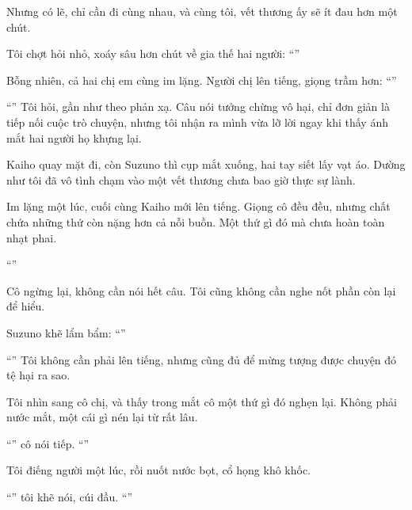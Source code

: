 \documentclass[../main.tex]{subfiles}
\begin{document}
Nhưng có lẽ, chỉ cần đi cùng nhau, và cùng tôi, vết thương ấy sẽ ít đau hơn một chút.

Tôi chợt hỏi nhỏ, xoáy sâu hơn chút về gia thế hai người: ``''

Bỗng nhiên, cả hai chị em cùng im lặng. Người chị lên tiếng, giọng trầm hơn: ``''

``'' Tôi hỏi, gần như theo phản xạ. Câu nói tưởng chừng vô hại, chỉ đơn giản là tiếp nối cuộc trò chuyện, nhưng tôi nhận ra mình vừa lỡ lời ngay khi thấy ánh mắt hai người họ khựng lại.

Kaiho quay mặt đi, còn Suzuno thì cụp mắt xuống, hai tay siết lấy vạt áo. Dường như tôi đã vô tình chạm vào một vết thương chưa bao giờ thực sự lành.

Im lặng một lúc, cuối cùng Kaiho mới lên tiếng. Giọng cô đều đều, nhưng chất chứa những thứ còn nặng hơn cả nỗi buồn. Một thứ gì đó mà chưa hoàn toàn nhạt phai.

``''

Cô ngừng lại, không cần nói hết câu. Tôi cũng không cần nghe nốt phần còn lại để hiểu.

Suzuno khẽ lẩm bẩm: ``''

``\vie{\dots}'' Tôi không cần phải lên tiếng, nhưng cũng đủ để mừng tượng được chuyện đó tệ hại ra sao.

Tôi nhìn sang cô chị, và thấy trong mắt cô một thứ gì đó nghẹn lại. Không phải nước mắt, một cái gì nén lại từ rất lâu.

``'' cô nói tiếp. ``''

Tôi điếng người một lúc, rồi nuốt nước bọt, cổ họng khô khốc.

``'' tôi khẽ nói, cúi đầu. ``''
\end{document}
